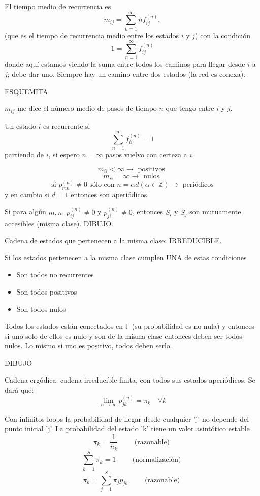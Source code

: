 \documentclass[10pt,oneside]{CBFT_book}
\begin{document}
El tiempo medio de recurrencia es
\[
	m_{ij} = \sum_{n=1}^\infty n f_{ij}^{(n)}, 
\]
(que es el tiempo de recurrencia medio entre los estados $i$ y $j$) con la condición 
\[	
	1 = \sum_{n=1}^\infty f_{ij}^{(n)}
\]
donde aquí estamos viendo la suma entre todos los caminos para llegar desde $i$ a $j$; debe dar uno.
Siempre hay un camino entre dos estados (la red es conexa).

ESQUEMITA

$m_{ij}$ me dice el número medio de pasos de tiempo $n$ que tengo entre $i$ y $j$.

Un estado $i$ es recurrente si 
\[
	\sum_{n=1}^\infty f_{ii}^{(n)} = 1
\]
partiendo de $i$, si espero $n=\infty$ pasos vuelvo con certeza a $i$.

\[
	m_{ii} < \infty \rightarrow \text{ positivos }
\]
\[
	m_{ii} = \infty \rightarrow \text{ nulos }
\]
\[
	\text{ si } p_{mn}^{(n)} \neq 0 \text{ sólo con } n=\alpha d (\alpha \in \mathbb{Z}) \rightarrow 
	\text{ periódicos } 
\]
y en cambio si $d=1$ entonces son aperiódicos.

Si para algún $m,n$, $p_{ij}^{(n)} \neq 0$ y $p_{ji}^{(n)} \neq 0$, entonces $S_i$ y $S_j$ son mutuamente accesibles 
(misma clase). DIBUJO.

Cadena de estados que pertenecen a la misma clase: IRREDUCIBLE.

Si los estados pertenecen a la misma clase cumplen UNA de estas condiciones 
\begin{itemize}
 \item Son todos no recurrentes
 \item Son todos positivos
 \item Son todos nulos
\end{itemize}

Todos los estados están conectados en $ \mathbb{\Gamma} $  (su probabilidad es no nula) y entonces
si uno solo de ellos es nulo y son de la misma clase entonces deben ser todos nulos.
Lo mismo si uno es positivo, todos deben serlo.

DIBUJO 

Cadena ergódica: cadena irreducible finita, con todos sus estados aperiódicos. 
Se dará que:
\[
	\boxed{ \lim_{n\to\infty} p_{jk}^{(n)} = \pi_k \quad \forall k }
\]

Con infinitos loops la probabilidad de llegar desde cualquier 'j' no depende del punto inicial 'j'.
La probabilidad del estado 'k' tiene un valor asintótico estable
\[
	\pi_k = \frac{1}{n_k} \qquad \text{ (razonable) } 
\]
\[
	\sum_{k=1}^S \pi_k = 1 \qquad \text{ (normalización) } 
\]
\[
	\pi_k = \sum_{j=1}^S \pi_j p_{jk}  \qquad \text{ (razonable) } 
\]
\end{document}
